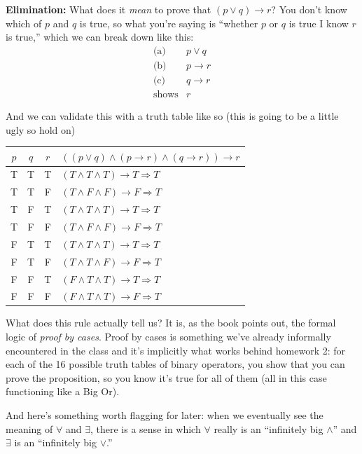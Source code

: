 \documentclass[11pt]{article}
\begin{document}
\noindent\textbf{Elimination:}
What does it \emph{mean} to prove that $(p \vee q) \to r$? You don't know which of $p$ and $q$ is true, so what you're saying is ``whether $p$ or $q$ is true I know $r$ is true,'' which we can break down like this:
\[
  \begin{array}{rl}
    \text{(a)} & p \vee q \\
    \text{(b)} & p \to r \\
    \text{(c)} & q \to r \\
    \hline
    \text{shows} & r
  \end{array}
\]

And we can validate this with a truth table like so (this is going to be a little ugly so hold on)

\begin{center}
\begin{tabular}{cccl}
\toprule
$p$ & $q$ & $r$ & $((p \vee q) \wedge (p \to r) \wedge (q \to r)) \to r$ \\
\midrule
T & T & T & $(T \wedge T \wedge T) \to T \Longrightarrow T$ \\
T & T & F & $(T \wedge F \wedge F) \to F \Longrightarrow T$ \\
T & F & T & $(T \wedge T \wedge T) \to T \Longrightarrow T$ \\
T & F & F & $(T \wedge F \wedge F) \to F \Longrightarrow T$ \\
F & T & T & $(T \wedge T \wedge T) \to T \Longrightarrow T$ \\
F & T & F & $(T \wedge T \wedge F) \to F \Longrightarrow T$ \\
F & F & T & $(F \wedge T \wedge T) \to T \Longrightarrow T$ \\
F & F & F & $(F \wedge T \wedge T) \to F \Longrightarrow T$ \\
\bottomrule
\end{tabular}
\end{center}

What does this rule actually tell us? It is, as the book points out, the formal logic of \emph{proof by cases}. Proof by cases is something we've already informally encountered in the class and it's implicitly what works behind homework 2: for each of the 16 possible truth tables of binary operators, you show that you can prove the proposition, so you know it's true for all of them (all in this case functioning like a Big Or).

And here's something worth flagging for later: when we eventually see the meaning of $\forall$ and $\exists$, there is a sense in which $\forall$ really is an ``infinitely big $\wedge$'' and $\exists$ is an ``infinitely big $\vee$.''
\end{document}
